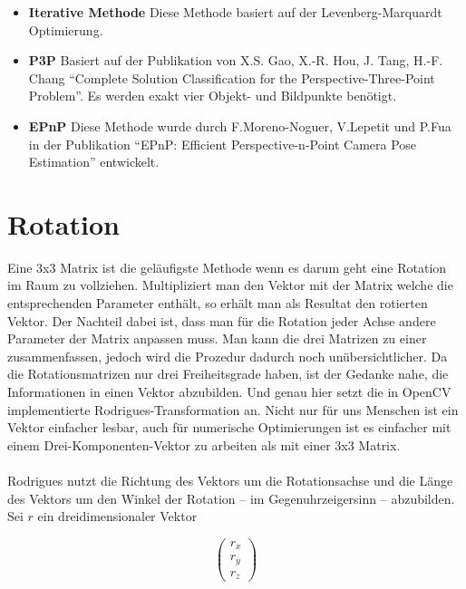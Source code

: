 \begin{itemize}

\item \textbf{Iterative Methode}
Diese Methode basiert auf der Levenberg-Marquardt Optimierung.

\item \textbf{P3P}
Basiert auf der Publikation von X.S. Gao, X.-R. Hou, J. Tang, H.-F. Chang ``Complete Solution Classification for the Perspective-Three-Point Problem''. Es werden exakt vier Objekt- und Bildpunkte benötigt.

\item \textbf{EPnP}
Diese Methode wurde durch F.Moreno-Noguer, V.Lepetit und P.Fua in der Publikation ``EPnP: Efficient Perspective-n-Point Camera Pose Estimation'' entwickelt.

\end{itemize}

\section{Rotation}
Eine 3x3 Matrix ist die geläufigste Methode wenn es darum geht eine Rotation im Raum zu vollziehen. Multipliziert man den Vektor mit der Matrix welche die entsprechenden Parameter enthält, so erhält man als Resultat den rotierten Vektor. Der Nachteil dabei ist, dass man für die Rotation jeder Achse andere Parameter der Matrix anpassen muss. Man kann die drei Matrizen zu einer zusammenfassen, jedoch wird die Prozedur dadurch noch unübersichtlicher. Da die Rotationsmatrizen nur drei Freiheitsgrade haben, ist der Gedanke nahe, die Informationen in einen Vektor abzubilden. Und genau hier setzt die in OpenCV implementierte Rodrigues-Transformation an. Nicht nur für uns Menschen ist ein Vektor einfacher lesbar, auch für numerische Optimierungen ist es einfacher mit einem Drei-Komponenten-Vektor zu arbeiten als mit einer 3x3 Matrix.

\paragraph{}
Rodrigues nutzt die Richtung des Vektors um die Rotationsachse und die Länge des Vektors um den Winkel der Rotation – im Gegenuhrzeigersinn – abzubilden. Sei $r$ ein dreidimensionaler Vektor 

\begin{equation}
\begin{pmatrix} r_x \\ r_y \\ r_z \end{pmatrix}
\end{equation}


